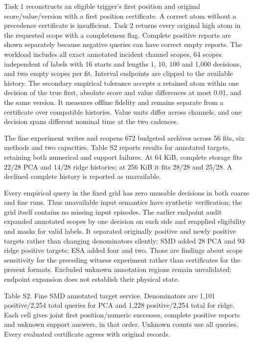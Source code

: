 \documentclass[11pt]{article}
\begin{document}
Task 1 reconstructs an eligible trigger’s first position and original score/value/version with a first position certificate. A correct atom without a precedence certificate is insufficient. Task 2 returns every original high atom in the requested scope with a completeness flag. Complete positive reports are shown separately because negative queries can have correct empty reports. The workload includes all exact annotated incident channel scopes, 64 scopes independent of labels with 16 starts and lengths 1, 10, 100 and 1,000 decisions, and two empty scopes per fit. Interval endpoints are clipped to the available history. The secondary empirical tolerance accepts a retained atom within one decision of the true first, absolute score and value differences at most 0.01, and the same version. It measures offline fidelity and remains separate from a certificate over compatible histories. Value units differ across channels, and one decision spans different nominal time at the two cadences.

The fine experiment writes and reopens 672 budgeted archives across 56 fits, six methods and two capacities. Table S2 reports results for annotated targets, retaining both numerical and support failures. At 64 KiB, complete storage fits 22/28 PCA and 14/28 ridge histories; at 256 KiB it fits 28/28 and 25/28. A declined complete history is reported as unavailable.

Every empirical query in the fixed grid has zero unusable decisions in both coarse and fine runs. Thus unavailable input semantics have synthetic verification; the grid itself contains no missing input episodes. The earlier endpoint audit expanded annotated scopes by one decision on each side and reapplied eligibility and masks for valid labels. It separated originally positive and newly positive targets rather than changing denominators silently: SMD added 28 PCA and 93 ridge positive targets; ESA added four and two. Those are findings about scope sensitivity for the preceding witness experiment rather than certificates for the present formats. Excluded unknown annotation regions remain unvalidated; endpoint expansion does not establish their physical state.

Table S2. Fine SMD annotated target service. Denominators are 1,101 positive/2,254 total queries for PCA and 1,228 positive/2,254 total for ridge. Each cell gives joint first position/numeric successes, complete positive reports and unknown support answers, in that order. Unknown counts use all queries. Every evaluated certificate agrees with original records.
\end{document}

